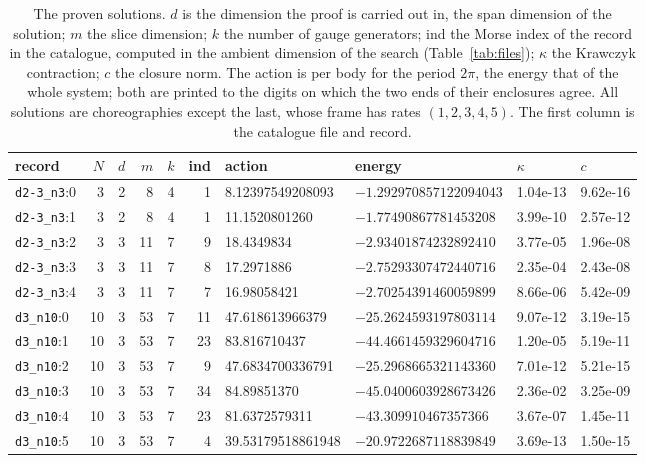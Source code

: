 \documentclass[11pt]{amsart}
\theoremstyle{definition}
\begin{document}
\begin{table}[ht]
\caption{The proven solutions. $d$ is the dimension the proof is carried out in, the span dimension of the solution; $m$ the slice dimension; $k$ the number of gauge generators; ind the Morse index of the record in the catalogue, computed in the ambient dimension of the search (Table~\ref{tab:files}); $\kappa$ the Krawczyk contraction; $c$ the closure norm. The action is per body for the period $2\pi$, the energy that of the whole system; both are printed to the digits on which the two ends of their enclosures agree. All solutions are choreographies except the last, whose frame has rates $(1,2,3,4,5)$. The first column is the catalogue file and record.}\label{tab:proven}
\centering\footnotesize\setlength{\tabcolsep}{4pt}
\begin{tabular}{@{}lrrrrrllll@{}}
\toprule
record & $N$ & $d$ & $m$ & $k$ & ind & action & energy & $\kappa$ & $c$\\
\midrule
\texttt{d2-3\_n3}:0 & 3 & 2 & 8 & 4 & 1 & 8.12397549208093 & $-1.292970857122094043$ & 1.04e-13 & 9.62e-16\\
\texttt{d2-3\_n3}:1 & 3 & 2 & 8 & 4 & 1 & 11.1520801260 & $-1.77490867781453208$ & 3.99e-10 & 2.57e-12\\
\texttt{d2-3\_n3}:2 & 3 & 3 & 11 & 7 & 9 & 18.4349834 & $-2.93401874232892410$ & 3.77e-05 & 1.96e-08\\
\texttt{d2-3\_n3}:3 & 3 & 3 & 11 & 7 & 8 & 17.2971886 & $-2.75293307472440716$ & 2.35e-04 & 2.43e-08\\
\texttt{d2-3\_n3}:4 & 3 & 3 & 11 & 7 & 7 & 16.98058421 & $-2.70254391460059899$ & 8.66e-06 & 5.42e-09\\
\texttt{d3\_n10}:0 & 10 & 3 & 53 & 7 & 11 & 47.618613966379 & $-25.2624593197803114$ & 9.07e-12 & 3.19e-15\\
\texttt{d3\_n10}:1 & 10 & 3 & 53 & 7 & 23 & 83.816710437 & $-44.4661459329604716$ & 1.20e-05 & 5.19e-11\\
\texttt{d3\_n10}:2 & 10 & 3 & 53 & 7 & 9 & 47.6834700336791 & $-25.2968665321143360$ & 7.01e-12 & 5.21e-15\\
\texttt{d3\_n10}:3 & 10 & 3 & 53 & 7 & 34 & 84.89851370 & $-45.0400603928673426$ & 2.36e-02 & 3.25e-09\\
\texttt{d3\_n10}:4 & 10 & 3 & 53 & 7 & 23 & 81.6372579311 & $-43.309910467357366$ & 3.67e-07 & 1.45e-11\\
\texttt{d3\_n10}:5 & 10 & 3 & 53 & 7 & 4 & 39.53179518861948 & $-20.9722687118839849$ & 3.69e-13 & 1.50e-15\\

\end{tabular}
\end{table}
\end{document}
